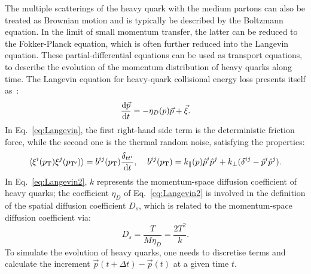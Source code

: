 The multiple scatterings of the heavy quark with the medium 
partons can also be treated as Brownian motion and is typically
be described by the Boltzmann equation. In the limit of small 
momentum transfer, the latter can be reduced to the 
Fokker-Planck equation, which is often further reduced into the
Langevin equation. These
partial-differential equations can be used as transport equations, 
to describe the evolution of the momentum distribution
of heavy quarks along time. The Langevin equation for heavy-quark 
collisional energy loss presents itself as~\cite{Cao:2013ita}:
\begin{equation}
\label{eq:Langevin}
\frac{{\rm d} {\vec{p}}}{{\rm d} t} = - \eta_D (p) \vec{p} + \vec{\xi}.
\end{equation}
In Eq.~\ref{eq:Langevin}, the first right-hand side term is the 
deterministic friction force, while the second one is the thermal random noise,
satisfying the properties:
\begin{equation}
\label{eq:Langevin2}
\langle {\xi^i (p_{\rm T})} {\xi^j (p_{\rm T'})} \rangle = b^{ij} (p_{\rm T}) \frac{\delta_{tt'}}{{\rm d} t}, \; \; \; \; b^{ij} (p_{\rm T}) = k_{\parallel}(p)\hat{p}^i\hat{p}^j + k_{\perp} (\delta^{ij} - \hat{p}^i\hat{p}^j).
\end{equation}
In Eq.~\ref{eq:Langevin2}, $k$ represents the momentum-space 
diffusion coefficient of heavy quarks;
the coefficient $\eta_D$ of Eq.~\ref{eq:Langevin2} is involved in the definition of the spatial 
diffusion coefficient $D_s$, which is related to the momentum-space 
diffusion coefficient via: 
\begin{equation}
\label{eq:Langevin3}
D_s = \frac{T}{M \eta_D} = \frac{2 T^2}{k}.
\end{equation}
To simulate the evolution of heavy quarks, one needs to discretise terms and calculate the increment 
$\vec{p}(t + \Delta t) -  \vec{p}(t)$ at a given time $t$. 

